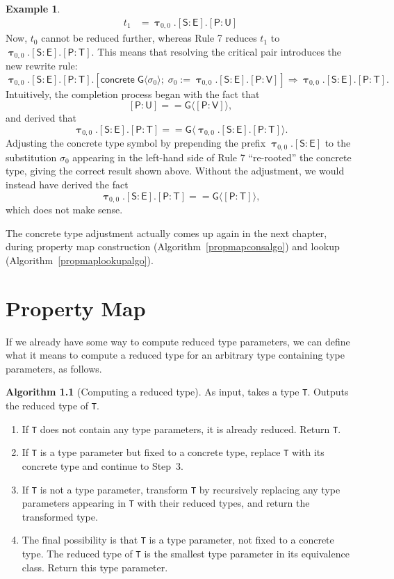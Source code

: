 \documentclass[a4paper,headsepline,bibliography=totoc,toc=flat,fleqn,twoside=semi]{scrbook}
\theoremstyle{definition}
\theoremstyle{definition}
\newtheorem{example}{Example}[chapter]
\theoremstyle{definition}
\newtheorem{algorithm}{Algorithm}[chapter]
\newcommand{\namesym}[1]{\mathsf{#1}}
\newcommand{\proto}[1]{\bm{\mathsf{#1}}}
\newcommand{\genericsym}[2]{\bm{\uptau}_{#1,#2}}
\newcommand{\assocsym}[2]{[\proto{#1}\colon\namesym{#2}]}
\newcommand{\concretesym}[1]{[\mathsf{concrete}\;#1]}
\newcommand{\ifWIP}{\iffalse}
\begin{document}
\begin{example}
\begin{align*}
t_1&=\genericsym{0}{0}.\assocsym{S}{E}.\assocsym{P}{U}
\end{align*}
Now, $t_0$ cannot be reduced further, whereas Rule 7 reduces $t_1$ to
$\genericsym{0}{0}.\assocsym{S}{E}.\assocsym{P}{T}$.
This means that resolving the critical pair introduces the new rewrite rule:
\[\genericsym{0}{0}.\assocsym{S}{E}.\assocsym{P}{T}.\concretesym{\namesym{G}\langle\sigma_0\rangle;\;\sigma_0:=\genericsym{0}{0}.\assocsym{S}{E}.\assocsym{P}{V}}\Rightarrow\genericsym{0}{0}.\assocsym{S}{E}.\assocsym{P}{T}.
\]
Intuitively, the completion process began with the fact that
\[\assocsym{P}{U}==\namesym{G}\langle\assocsym{P}{V}\rangle,\]
and derived that\
\[\genericsym{0}{0}.\assocsym{S}{E}.\assocsym{P}{T}==\namesym{G}\langle\genericsym{0}{0}.\assocsym{S}{E}.\assocsym{P}{T}\rangle.\]
Adjusting the concrete type symbol by prepending the prefix $\genericsym{0}{0}.\assocsym{S}{E}$ to the substitution $\sigma_0$ appearing in the left-hand side of Rule 7 ``re-rooted'' the concrete type, giving the correct result shown above. Without the adjustment, we would instead have derived the fact
\[\genericsym{0}{0}.\assocsym{S}{E}.\assocsym{P}{T}==\namesym{G}\langle\assocsym{P}{T}\rangle,\]
which does not make sense.
\end{example}
The concrete type adjustment actually comes up again in the next chapter, during property map construction (Algorithm~\ref{propmapconsalgo}) and lookup (Algorithm~\ref{propmaplookupalgo}).
\fi

\chapter{Property Map}\label{propertymap}

\ifWIP
If we already have some way to compute reduced type parameters, we can define what it means to compute a reduced type for an arbitrary type containing type parameters, as follows.
\begin{algorithm}[Computing a reduced type]\label{reducedtypealgo}
As input, takes a type \texttt{T}. Outputs the reduced type of \texttt{T}.

\begin{enumerate}
\item If \texttt{T} does not contain any type parameters, it is already reduced. Return \texttt{T}.
\item If \texttt{T} is a type parameter but fixed to a concrete type, replace \texttt{T} with its concrete type and continue to Step~3.
\item If \texttt{T} is not a type parameter, transform \texttt{T} by recursively replacing any type parameters appearing in \texttt{T} with their reduced types, and return the transformed type.
\item The final possibility is that \texttt{T} is a type parameter, not fixed to a concrete type. The reduced type of \texttt{T} is the smallest type parameter in its equivalence class. Return this type parameter.
\end{enumerate}
\end{algorithm}
\end{document}
